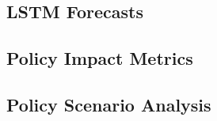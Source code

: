 \subsection{LSTM Forecasts}
\label{app:lstm_forecasts}

\subsection{Policy Impact Metrics}
\label{app:policy_impact_metrics}

\subsection{Policy Scenario Analysis}
\label{app:policy_scenario_analysis}
